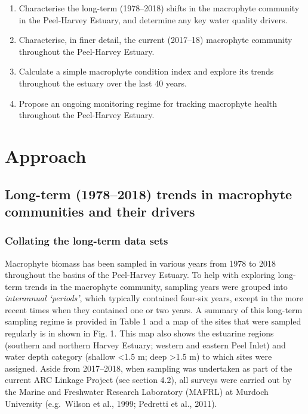 \documentclass[
]{book}
\begin{document}
\begin{enumerate}
\def\labelenumi{\arabic{enumi}.}
\item
  Characterise the long-term (1978--2018) shifts in the macrophyte community in the Peel-Harvey Estuary, and determine any key water quality drivers.
\item
  Characterise, in finer detail, the current (2017--18) macrophyte community throughout the Peel-Harvey Estuary.
\item
  Calculate a simple macrophyte condition index and explore its trends throughout the estuary over the last 40 years.
\item
  Propose an ongoing monitoring regime for tracking macrophyte health throughout the Peel-Harvey Estuary.
\end{enumerate}

\hypertarget{approach-}{%
\section{Approach}\label{approach-}}

\hypertarget{long-term-19782018-trends-in-macrophyte-communities-and-their-drivers}{%
\subsection{Long-term (1978--2018) trends in macrophyte communities and their drivers}\label{long-term-19782018-trends-in-macrophyte-communities-and-their-drivers}}

\hypertarget{collating-the-long-term-data-sets}{%
\subsubsection{Collating the long-term data sets}\label{collating-the-long-term-data-sets}}

Macrophyte biomass has been sampled in various years from 1978 to 2018 throughout the basins of the Peel-Harvey Estuary. To help with exploring long-term trends in the macrophyte community, sampling years were grouped into \emph{interannual `periods'}, which typically contained four-six years, except in the more recent times when they contained one or two years. A summary of this long-term sampling regime is provided in Table 1 and a map of the sites that were sampled regularly is in shown in Fig. 1. This map also shows the estuarine regions (southern and northern Harvey Estuary; western and eastern Peel Inlet) and water depth category (shallow \textless1.5 m; deep \textgreater1.5 m) to which sites were assigned. Aside from 2017--2018, when sampling was undertaken as part of the current ARC Linkage Project (see section 4.2), all surveys were carried out by the Marine and Freshwater Research Laboratory (MAFRL) at Murdoch University (e.g.~Wilson et al., 1999; Pedretti et al., 2011).
\end{document}
